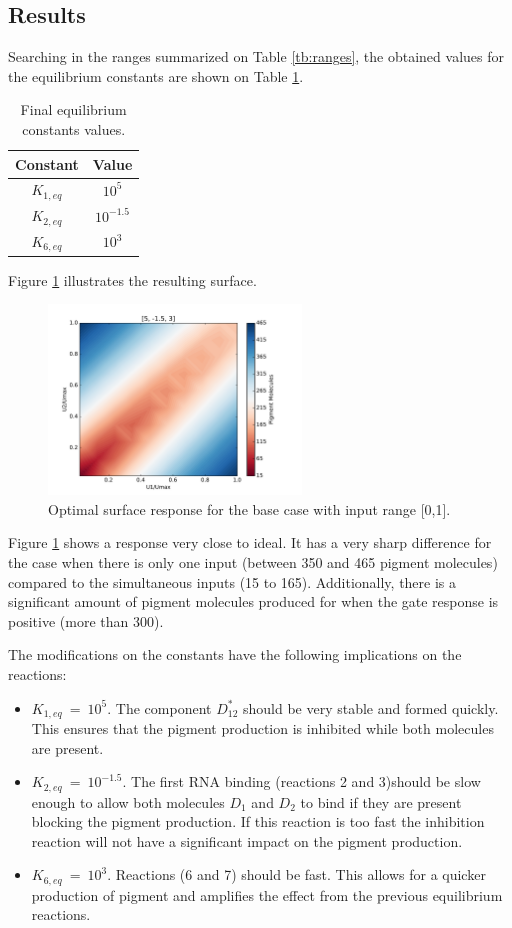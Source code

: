 \documentclass[10pt]{article}
\begin{document}
\subsection{Results}
Searching in the ranges summarized on Table \ref{tb:ranges}, the obtained values for the equilibrium constants are shown on Table \ref{tb:optcon}.
\begin{table}[h]
\centering
\caption{Final equilibrium constants values.} \label{tb:optcon}
\begin{tabular}{c|c}
Constant & Value \\ \hline
$K_{1,eq}$ & $10^{5}$  \\ 
$K_{2,eq}$ & $10^{-1.5}$ \\
$K_{6,eq}$ & $10^{3}$ 
\end{tabular} 
\end{table}
Figure \ref{fig:surfopt} illustrates the resulting surface. 
\begin{figure}[h]
	\centering
	\includegraphics[width=0.6\textwidth]{Surface2.pdf} 
	\caption{Optimal surface response for the base case with input range [0,1].}\label{fig:surfopt}
\end{figure}
Figure \ref{fig:surfopt} shows a response very close to ideal. It has a very sharp difference for the case when there is only one input (between 350 and 465 pigment molecules) compared to the simultaneous inputs (15 to 165). Additionally, there is a significant amount of pigment molecules produced for when the gate response is positive (more than 300). \par 
The modifications on the constants have the following implications on the reactions: 
\begin{itemize}
\item $K_{1,eq}~ = ~10^{5}$. The component $D^*_{12}$ should be very stable and formed quickly. This ensures that the pigment production is inhibited while both molecules are present.
\item $K_{2,eq}~=~10^{-1.5}$. The first RNA binding (reactions 2 and 3)should be slow enough to allow both molecules $ D_1$ and $D_2$ to bind if they are present blocking the pigment production. If this reaction is too fast the inhibition reaction will not have a significant impact on the pigment production. 
\item $K_{6,eq}~=~10^{3}$. Reactions (6 and 7) should be fast. This allows for a quicker production of pigment and amplifies the effect from the previous equilibrium reactions.  
\end{itemize}
\end{document}
